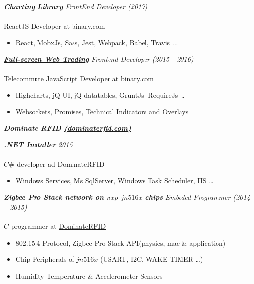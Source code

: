 \documentclass{article}
\newcommand{\hh}[1]{\large{\textit{\textbf{#1}}}}
\newcommand{\hhhh}[1]{\LARGE{\textit{\textbf{#1}}}}
\renewcommand{\i}[1]{\normalsize{\textit{#1}}}
\begin{document}
\hh{\href{https://charts.binary.com}{Charting Library}} \hfill \i{FrontEnd Developer (2017)} \\ \vspace {-.35cm} \\
ReactJS Developer at binary.com \\ \vspace{-.9cm}
\begin{itemize}
 \setlength{\itemsep}{1pt} \setlength{\parskip}{0pt} \setlength{\parsep}{0pt}
    \item React, MobxJs, Sass, Jest, Webpack, Babel, Travis ...
\end{itemize}  \vspace{-.1cm}

\hh{\href{https://webtrader.binary.com}{Full-screen Web Trading}} \hfill \i{Frontend Developer (2015 - 2016)} \\ \vspace {-.35cm} \\
Telecommute JavaScript Developer at binary.com \\ \vspace{-.9cm}
\begin{itemize}
 \setlength{\itemsep}{1pt} \setlength{\parskip}{0pt} \setlength{\parsep}{0pt}
    \item Highcharts, jQ UI, jQ datatables, GruntJs, RequireJs \dots
    \item Websockets, Promises, Technical Indicators and Overlays
\end{itemize}

\vspace{.1cm}
 {\hhhh{Dominate RFID \href{http://www.dominaterfid.com/}{(dominaterfid.com)}}}
 
 \hh{.NET Installer} \hfill \i{2015} \\ \vspace {-.35cm} \\
 $C\#$ developer ad DominateRFID \\ \vspace{-.9cm}
 \begin{itemize}
  \setlength{\itemsep}{1pt} \setlength{\parskip}{0pt} \setlength{\parsep}{0pt}
     \item Windows Services, Ms SqlServer, Windows Task Scheduler, IIS \dots
 \end{itemize}

\hh{Zigbee Pro Stack network on $nxp$ $jn516x$ chips} \hfill \i{Embeded Programmer (2014 -- 2015)} \\ \vspace{-.35cm} \\
$C$ programmer at \href{http://www.dominaterfid.com/}{DominateRFID} \\ \vspace{-.9cm}
\begin{itemize}
 \setlength{\itemsep}{1pt} \setlength{\parskip}{0pt} \setlength{\parsep}{0pt}
    \item 802.15.4 Protocol, Zigbee Pro Stack API(physics, mac \& application)
    \item Chip Peripherals of $jn516x$ (USART, I2C, WAKE TIMER \dots)
    \item Humidity-Temperature \& Accelerometer Sensors
\end{itemize}
\end{document}
